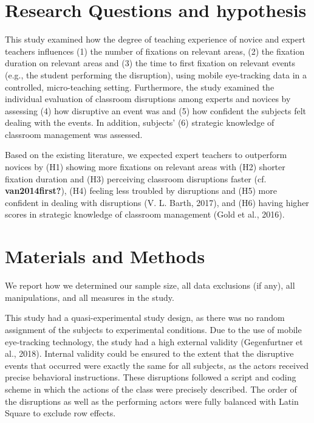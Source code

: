 \documentclass[
  man]{apa6}
\begin{document}
\section{Research Questions and hypothesis}\label{research-questions-and-hypothesis}

This study examined how the degree of teaching experience of novice and expert teachers influences (1) the number of fixations on relevant areas, (2) the fixation duration on relevant areas and (3) the time to first fixation on relevant events (e.g., the student performing the disruption), using mobile eye-tracking data in a controlled, micro-teaching setting. Furthermore, the study examined the individual evaluation of classroom disruptions among experts and novices by assessing (4) how disruptive an event was and (5) how confident the subjects felt dealing with the events. In addition, subjects' (6) strategic knowledge of classroom management was assessed.

Based on the existing literature, we expected expert teachers to outperform novices by (H1) showing more fixations on relevant areas with (H2) shorter fixation duration and (H3) perceiving classroom disruptions faster (cf. \textbf{van2014first?}), (H4) feeling less troubled by disruptions and (H5) more confident in dealing with disruptions (V. L. Barth, 2017), and (H6) having higher scores in strategic knowledge of classroom management (Gold et al., 2016).

\section{Materials and Methods}\label{materials-and-methods}

We report how we determined our sample size, all data exclusions (if any), all manipulations, and all measures in the study.

This study had a quasi-experimental study design, as there was no random assignment of the subjects to experimental conditions. Due to the use of mobile eye-tracking technology, the study had a high external validity (Gegenfurtner et al., 2018). Internal validity could be ensured to the extent that the disruptive events that occurred were exactly the same for all subjects, as the actors received precise behavioral instructions. These disruptions followed a script and coding scheme in which the actions of the class were precisely described. The order of the disruptions as well as the performing actors were fully balanced with Latin Square to exclude row effects.
\end{document}
